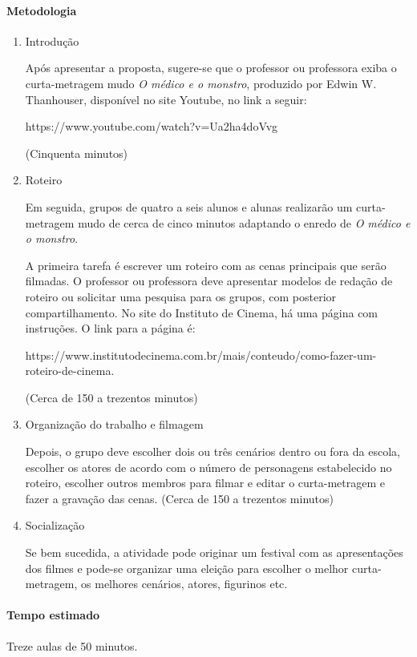 \documentclass[12pt]{extarticle}
\begin{document}
\paragraph{Metodologia}
\begin{enumerate}
\item
Introdução

Após apresentar a proposta, sugere-se que o professor ou professora
exiba o curta-metragem mudo \emph{O médico e o monstro}, produzido por
Edwin W. Thanhouser, disponível no site Youtube, no link a seguir:

https://www.youtube.com/watch?v=Ua2ha4doVvg

(Cinquenta minutos)

\item
Roteiro

Em seguida, grupos de quatro a seis alunos e alunas realizarão um
curta-metragem mudo de cerca de cinco minutos adaptando o enredo de
\emph{O médico e o monstro}.

A primeira tarefa é escrever um roteiro com as cenas principais que
serão filmadas. O professor ou professora deve apresentar modelos de
redação de roteiro ou solicitar uma pesquisa para os grupos, com
posterior compartilhamento. No site do Instituto de Cinema, há uma
página com instruções. O link para a página é:

https://www.institutodecinema.com.br/mais/conteudo/como-fazer-um-roteiro-de-cinema.

(Cerca de 150 a trezentos minutos)

\item
Organização do trabalho e filmagem

Depois, o grupo deve escolher dois ou três cenários dentro ou fora da
escola, escolher os atores de acordo com o número de personagens
estabelecido no roteiro, escolher outros membros para filmar e editar o
curta-metragem e fazer a gravação das cenas. (Cerca de 150 a trezentos
minutos)

\item
Socialização

Se bem sucedida, a atividade pode originar um festival com as
apresentações dos filmes e pode-se organizar uma eleição para escolher o
melhor curta-metragem, os melhores cenários, atores, figurinos etc.
\end{enumerate}

\paragraph{Tempo estimado} Treze aulas de 50 minutos.
\end{document}
